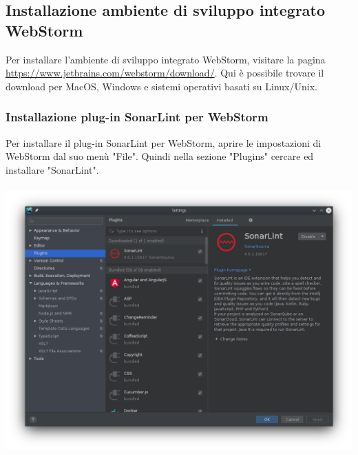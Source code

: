 \subsection{Installazione ambiente di sviluppo integrato WebStorm}
Per installare l'ambiente di sviluppo integrato WebStorm, visitare la pagina \url{https://www.jetbrains.com/webstorm/download/}. Qui è possibile trovare il download per MacOS, Windows e sistemi operativi basati su Linux/Unix.
\\

\subsubsection{Installazione plug-in SonarLint per WebStorm}
Per installare il plug-in SonarLint per WebStorm, aprire le impostazioni di WebStorm dal suo menù "File". Quindi nella sezione "Plugins" cercare ed installare "SonarLint".
\\
\\
\includegraphics[width=\textwidth,height=\textheight,keepaspectratio]{img/sonarlint.png}
